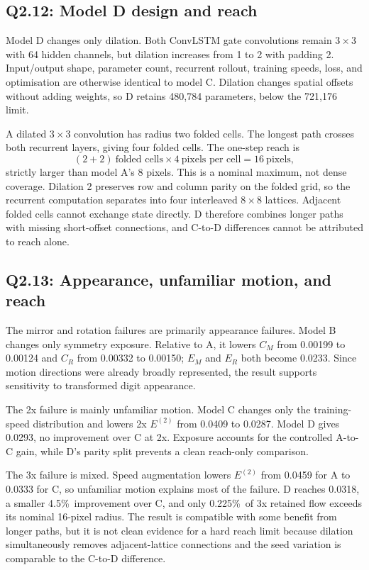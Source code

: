 \documentclass{article}
\newcommand{\pct}{\%\ }
\newcommand{\Etwo}{\ensuremath{E^{(2)}}}
\newcommand{\CM}{\ensuremath{C_M}}
\newcommand{\CR}{\ensuremath{C_R}}
\newcommand{\EM}{\ensuremath{E_M}}
\newcommand{\ER}{\ensuremath{E_R}}
\begin{document}
\subsection*{Q2.12: Model D design and reach}

Model D changes only dilation. Both ConvLSTM gate convolutions remain $3\times3$ with 64 hidden channels, but dilation increases from 1 to 2 with padding 2. Input/output shape, parameter count, recurrent rollout, training speeds, loss, and optimisation are otherwise identical to model C. Dilation changes spatial offsets without adding weights, so D retains 480,784 parameters, below the 721,176 limit.

A dilated $3\times3$ convolution has radius two folded cells. The longest path crosses both recurrent layers, giving four folded cells. The one-step reach is
\begin{equation}
  (2+2)\ \text{folded cells}\times4\ \text{pixels per cell}=16\ \text{pixels},
\end{equation}
strictly larger than model A's 8 pixels. This is a nominal maximum, not dense coverage. Dilation 2 preserves row and column parity on the folded grid, so the recurrent computation separates into four interleaved $8\times8$ lattices. Adjacent folded cells cannot exchange state directly. D therefore combines longer paths with missing short-offset connections, and C-to-D differences cannot be attributed to reach alone.

\subsection*{Q2.13: Appearance, unfamiliar motion, and reach}

The mirror and rotation failures are primarily appearance failures. Model B changes only symmetry exposure. Relative to A, it lowers \CM{} from 0.00199 to 0.00124 and \CR{} from 0.00332 to 0.00150; \EM{} and \ER{} both become 0.0233. Since motion directions were already broadly represented, the result supports sensitivity to transformed digit appearance.

The 2x failure is mainly unfamiliar motion. Model C changes only the training-speed distribution and lowers 2x \Etwo{} from 0.0409 to 0.0287. Model D gives 0.0293, no improvement over C at 2x. Exposure accounts for the controlled A-to-C gain, while D's parity split prevents a clean reach-only comparison.

The 3x failure is mixed. Speed augmentation lowers \Etwo{} from 0.0459 for A to 0.0333 for C, so unfamiliar motion explains most of the failure. D reaches 0.0318, a smaller 4.5\pct improvement over C, and only 0.225\pct of 3x retained flow exceeds its nominal 16-pixel radius. The result is compatible with some benefit from longer paths, but it is not clean evidence for a hard reach limit because dilation simultaneously removes adjacent-lattice connections and the seed variation is comparable to the C-to-D difference.
\end{document}
